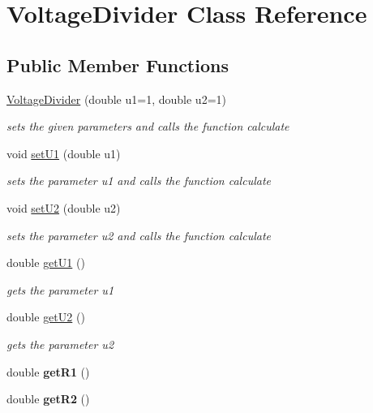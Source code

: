 \hypertarget{classVoltageDivider}{}\section{Voltage\+Divider Class Reference}
\label{classVoltageDivider}
\subsection*{Public Member Functions}
\begin{DoxyCompactItemize}
\item 
\hyperlink{classVoltageDivider_a7e71609cdfe3faa54ddfde5c7634a92c}{Voltage\+Divider} (double u1=1, double u2=1)
\begin{DoxyCompactList}\small\item\em sets the given parameters and calls the function calculate \end{DoxyCompactList}\item 
void \hyperlink{classVoltageDivider_aecff4be4ac8dbe9dbee07f57a15cc370}{set\+U1} (double u1)
\begin{DoxyCompactList}\small\item\em sets the parameter u1 and calls the function calculate \end{DoxyCompactList}\item 
void \hyperlink{classVoltageDivider_a52270fd71980ed94bc64e7a6f65a9e5c}{set\+U2} (double u2)
\begin{DoxyCompactList}\small\item\em sets the parameter u2 and calls the function calculate \end{DoxyCompactList}\item 
double \hyperlink{classVoltageDivider_a36ab249dd0f1e5cb7b055affd249af6c}{get\+U1} ()
\begin{DoxyCompactList}\small\item\em gets the parameter u1 \end{DoxyCompactList}\item 
double \hyperlink{classVoltageDivider_aee0957fabf473c72488e3d5fa7316bcd}{get\+U2} ()
\begin{DoxyCompactList}\small\item\em gets the parameter u2 \end{DoxyCompactList}\item 
\mbox{\label{classVoltageDivider_ac9928564fe59e40e12346222a7eb82a2}} 
double {\bfseries get\+R1} ()
\item 
\mbox{\label{classVoltageDivider_aa83138c075ea0b37a20d65e4d7cc068b}} 
double {\bfseries get\+R2} ()
\end{DoxyCompactItemize}



